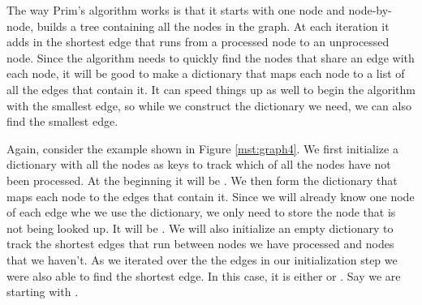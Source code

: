 The way Prim's algorithm works is that it starts with one node and node-by-node, builds a tree containing all the nodes in the graph.
At each iteration it adds in the shortest edge that runs from a processed node to an unprocessed node.
Since the algorithm needs to quickly find the nodes that share an edge with each node, it will be good to make a dictionary that maps each node to a list of all the edges that contain it.
It can speed things up as well to begin the algorithm with the smallest edge, so while we construct the dictionary we need, we can also find the smallest edge. 

Again, consider the example shown in Figure \ref{mst:graph4}.
We first initialize a dictionary with all the nodes as keys to track which of all the nodes have not been processed.
At the beginning it will be .
We then form the dictionary that maps each node to the edges that contain it.
Since we will already know one node of each edge whe we use the dictionary, we only need to store the node that is not being looked up.
It will be .
We will also initialize an empty dictionary to track the shortest edges that run between nodes we have processed and nodes that we haven't.
As we iterated over the the edges in our initialization step we were also able to find the shortest edge.
In this case, it is either  or .
Say we are starting with .
